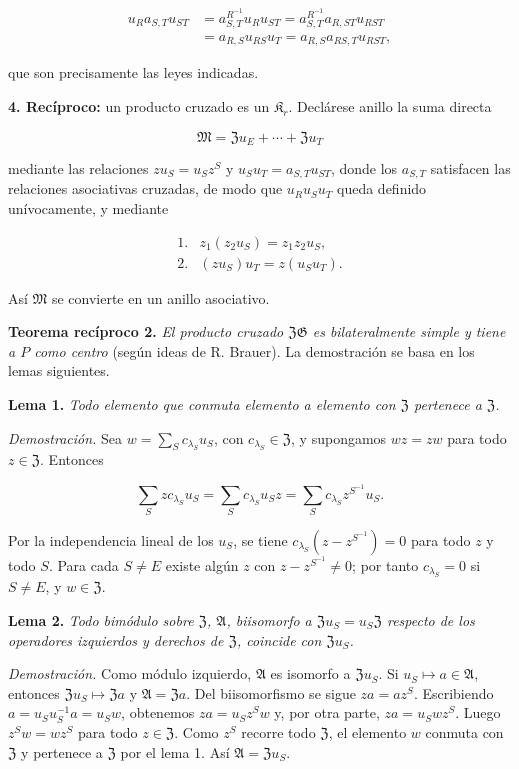 \[
\begin{aligned}
u_Ra_{S,T}u_{ST}
&=a_{S,T}^{R^{-1}}u_Ru_{ST}
=a_{S,T}^{R^{-1}}a_{R,ST}u_{RST}\\
&=a_{R,S}u_{RS}u_T
=a_{R,S}a_{RS,T}u_{RST},
\end{aligned}
\]

que son precisamente las leyes indicadas.

\noindent\textbf{4. Recíproco:} un producto cruzado es un $\mathfrak K_r$. Declárese anillo la suma directa

\[
\mathfrak M=\mathfrak Zu_E+\cdots+\mathfrak Zu_T
\]

mediante las relaciones $zu_S=u_Sz^S$ y $u_Su_T=a_{S,T}u_{ST}$, donde los $a_{S,T}$ satisfacen las relaciones asociativas cruzadas, de modo que $u_Ru_Su_T$ queda definido unívocamente, y mediante

\[
\begin{array}{ll}
1.&z_1(z_2u_S)=z_1z_2u_S,\\[2pt]
2.&(zu_S)u_T=z(u_Su_T).
\end{array}
\]

Así $\mathfrak M$ se convierte en un anillo asociativo.

\noindent\textbf{Teorema recíproco 2.} \emph{El producto cruzado $\mathfrak Z\mathfrak G$ es bilateralmente simple y tiene a $P$ como centro} (según ideas de R. Brauer). La demostración se basa en los lemas siguientes.

\noindent\textbf{Lema 1.} \emph{Todo elemento que conmuta elemento a elemento con $\mathfrak Z$ pertenece a $\mathfrak Z$.}

\noindent\emph{Demostración.} Sea $w=\sum_Sc_{\lambda_S}u_S$, con $c_{\lambda_S}\in\mathfrak Z$, y supongamos $wz=zw$ para todo $z\in\mathfrak Z$. Entonces

\[
\sum_Szc_{\lambda_S}u_S
=\sum_Sc_{\lambda_S}u_Sz
=\sum_Sc_{\lambda_S}z^{S^{-1}}u_S.
\]

Por la independencia lineal de los $u_S$, se tiene $c_{\lambda_S}(z-z^{S^{-1}})=0$ para todo $z$ y todo $S$. Para cada $S\ne E$ existe algún $z$ con $z-z^{S^{-1}}\ne0$; por tanto $c_{\lambda_S}=0$ si $S\ne E$, y $w\in\mathfrak Z$.

\noindent\textbf{Lema 2.} \emph{Todo bimódulo sobre $\mathfrak Z$, $\mathfrak A$, biisomorfo a $\mathfrak Zu_S=u_S\mathfrak Z$ respecto de los operadores izquierdos y derechos de $\mathfrak Z$, coincide con $\mathfrak Zu_S$.}

\noindent\emph{Demostración.} Como módulo izquierdo, $\mathfrak A$ es isomorfo a $\mathfrak Zu_S$. Si $u_S\mapsto a\in\mathfrak A$, entonces $\mathfrak Zu_S\mapsto\mathfrak Za$ y $\mathfrak A=\mathfrak Za$. Del biisomorfismo se sigue $za=az^S$. Escribiendo $a=u_Su_S^{-1}a=u_Sw$, obtenemos $za=u_Sz^Sw$ y, por otra parte, $za=u_Swz^S$. Luego $z^Sw=wz^S$ para todo $z\in\mathfrak Z$. Como $z^S$ recorre todo $\mathfrak Z$, el elemento $w$ conmuta con $\mathfrak Z$ y pertenece a $\mathfrak Z$ por el lema 1. Así $\mathfrak A=\mathfrak Zu_S$.

